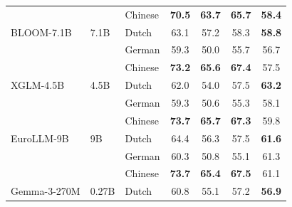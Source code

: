 \documentclass[11pt]{article}
\begin{document}
\begin{table}[!ht]
\begin{tabular}{ll l cccc}
 &  & Chinese & \cellcolor[rgb]{0.786,1.000,0.786} \textbf{70.5} & \cellcolor[rgb]{0.827,1.000,0.827} \textbf{63.7} & \cellcolor[rgb]{0.792,1.000,0.792} \textbf{65.7} & \cellcolor[rgb]{0.828,1.000,0.828} \textbf{58.4} \\
\addlinespace[2pt]
BLOOM-7.1B & 7.1B & Dutch & \cellcolor[rgb]{0.863,1.000,0.863} 63.1 & \cellcolor[rgb]{0.909,1.000,0.909} 57.2 & \cellcolor[rgb]{0.890,1.000,0.890} 58.3 & \cellcolor[rgb]{0.820,1.000,0.820} \textbf{58.8} \\
 &  & German & \cellcolor[rgb]{0.903,1.000,0.903} 59.3 & \cellcolor[rgb]{0.999,1.000,0.999} 50.0 & \cellcolor[rgb]{0.925,1.000,0.925} 55.7 & \cellcolor[rgb]{0.863,1.000,0.863} 56.7 \\
 &  & Chinese & \cellcolor[rgb]{0.758,1.000,0.758} \textbf{73.2} & \cellcolor[rgb]{0.803,1.000,0.803} \textbf{65.6} & \cellcolor[rgb]{0.770,1.000,0.770} \textbf{67.4} & \cellcolor[rgb]{0.847,1.000,0.847} 57.5 \\
\addlinespace[2pt]
XGLM-4.5B & 4.5B & Dutch & \cellcolor[rgb]{0.875,1.000,0.875} 62.0 & \cellcolor[rgb]{0.950,1.000,0.950} 54.0 & \cellcolor[rgb]{0.901,1.000,0.901} 57.5 & \cellcolor[rgb]{0.730,1.000,0.730} \textbf{63.2} \\
 &  & German & \cellcolor[rgb]{0.903,1.000,0.903} 59.3 & \cellcolor[rgb]{0.992,1.000,0.992} 50.6 & \cellcolor[rgb]{0.930,1.000,0.930} 55.3 & \cellcolor[rgb]{0.834,1.000,0.834} 58.1 \\
 &  & Chinese & \cellcolor[rgb]{0.753,1.000,0.753} \textbf{73.7} & \cellcolor[rgb]{0.802,1.000,0.802} \textbf{65.7} & \cellcolor[rgb]{0.771,1.000,0.771} \textbf{67.3} & \cellcolor[rgb]{0.800,1.000,0.800} 59.8 \\
\addlinespace[2pt]
EuroLLM-9B & 9B & Dutch & \cellcolor[rgb]{0.850,1.000,0.850} 64.4 & \cellcolor[rgb]{0.921,1.000,0.921} 56.3 & \cellcolor[rgb]{0.901,1.000,0.901} 57.5 & \cellcolor[rgb]{0.763,1.000,0.763} \textbf{61.6} \\
 &  & German & \cellcolor[rgb]{0.893,1.000,0.893} 60.3 & \cellcolor[rgb]{0.990,1.000,0.990} 50.8 & \cellcolor[rgb]{0.932,1.000,0.932} 55.1 & \cellcolor[rgb]{0.769,1.000,0.769} 61.3 \\
 &  & Chinese & \cellcolor[rgb]{0.753,1.000,0.753} \textbf{73.7} & \cellcolor[rgb]{0.806,1.000,0.806} \textbf{65.4} & \cellcolor[rgb]{0.768,1.000,0.768} \textbf{67.5} & \cellcolor[rgb]{0.773,1.000,0.773} 61.1 \\
\addlinespace[2pt]
Gemma-3-270M & 0.27B & Dutch & \cellcolor[rgb]{0.887,1.000,0.887} 60.8 & \cellcolor[rgb]{0.936,1.000,0.936} 55.1 & \cellcolor[rgb]{0.905,1.000,0.905} 57.2 & \cellcolor[rgb]{0.859,1.000,0.859} \textbf{56.9} \\

\end{tabular}
\end{table}
\end{document}
